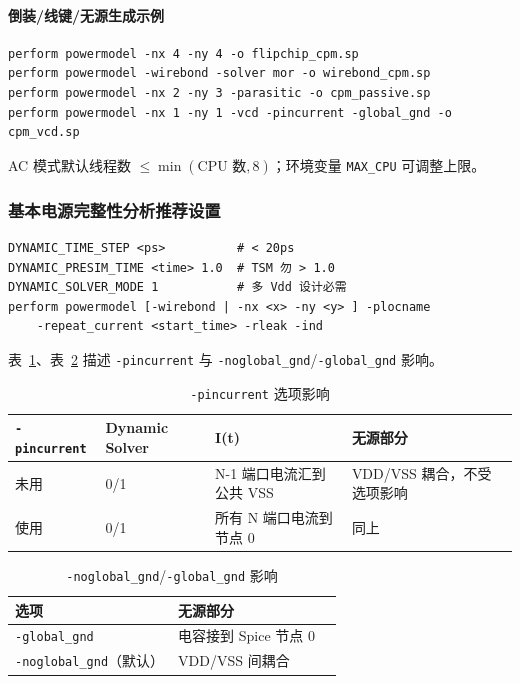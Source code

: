 \paragraph{倒装/线键/无源生成示例}
\begin{lstlisting}
perform powermodel -nx 4 -ny 4 -o flipchip_cpm.sp
perform powermodel -wirebond -solver mor -o wirebond_cpm.sp
perform powermodel -nx 2 -ny 3 -parasitic -o cpm_passive.sp
perform powermodel -nx 1 -ny 1 -vcd -pincurrent -global_gnd -o cpm_vcd.sp
\end{lstlisting}

AC 模式默认线程数 $\le \min(\text{CPU 数}, 8)$；环境变量 \texttt{MAX\_CPU} 可调整上限。


\subsubsection{基本电源完整性分析推荐设置}
\begin{lstlisting}
DYNAMIC_TIME_STEP <ps>          # < 20ps
DYNAMIC_PRESIM_TIME <time> 1.0  # TSM 勿 > 1.0
DYNAMIC_SOLVER_MODE 1           # 多 Vdd 设计必需
perform powermodel [-wirebond | -nx <x> -ny <y> ] -plocname
    -repeat_current <start_time> -rleak -ind
\end{lstlisting}

表~\ref{tab:cpm-pincurrent}、表~\ref{tab:cpm-gnd} 描述 \texttt{-pincurrent} 与 \texttt{-noglobal\_gnd}/\texttt{-global\_gnd} 影响。

\begin{table}[htbp]
\centering
\small
\caption{\texttt{-pincurrent} 选项影响}
\label{tab:cpm-pincurrent}
\begin{tabular}{llll}
\toprule
\texttt{-pincurrent} & Dynamic Solver & I(t) & 无源部分 \\
\midrule
未用 & 0/1 & N-1 端口电流汇到公共 VSS & VDD/VSS 耦合，不受选项影响 \\
使用 & 0/1 & 所有 N 端口电流到节点 0 & 同上 \\
\bottomrule
\end{tabular}
\end{table}

\begin{table}[htbp]
\centering
\small
\caption{\texttt{-noglobal\_gnd}/\texttt{-global\_gnd} 影响}
\label{tab:cpm-gnd}
\begin{tabular}{lll}
\toprule
选项 & 无源部分 \\
\midrule
\texttt{-global\_gnd} & 电容接到 Spice 节点 0 \\
\texttt{-noglobal\_gnd}（默认） & VDD/VSS 间耦合 \\
\bottomrule
\end{tabular}
\end{table}

